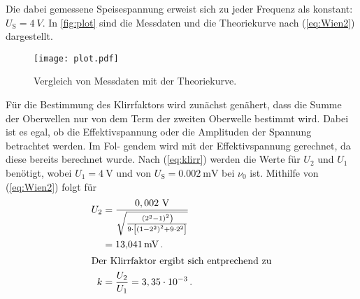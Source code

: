 Die dabei gemessene Speisespannung erweist sich zu jeder Frequenz als konstant: $U_\text{S} = \qty{4}{V}$.
In \autoref{fig:plot} sind die Messdaten und die Theoriekurve nach (\ref{eq:Wien2}) dargestellt.
\begin{figure}
  \centering
  \texttt{[image: plot.pdf]}
  \caption{Vergleich von Messdaten mit der Theoriekurve.}
  \label{fig:plot}
\end{figure}

Für die Bestimmung des Klirrfaktors wird zunächst genähert, dass die Summe der
Oberwellen nur von dem Term der zweiten Oberwelle bestimmt wird. Dabei ist es egal,
ob die Effektivspannung oder die Amplituden der Spannung betrachtet werden. Im Fol-
gendem wird mit der Effektivspannung gerechnet, da diese bereits berechnet wurde.
Nach (\ref{eq:klirr}) werden die Werte für $U_2$ und $U_1$ benötigt, wobei $U_1 = \qty{4}{\volt}$ und
von $U_\text{S} = \qty{0.002}{\milli\volt}$ bei $\nu_0$ ist. 
Mithilfe von (\ref{eq:Wien2}) folgt für
\begin{align*}
  U_{2} &=\frac{0,002 \mathrm{~V}}{\sqrt{\frac{\left.\left(2^{2}-1\right)^{2}\right)}{9 \cdot\left[\left(1-2^{2}\right)^{2}+9 \cdot 2^{2}\right]}}} \\
  &= \qty{13,041}{\milli\volt} \, . \\
  \intertext{Der Klirrfaktor ergibt sich entprechend zu}
  k&=\frac{U_{2}}{U_{1}}= 3,35 \cdot 10^{-3} \, .
\end{align*}